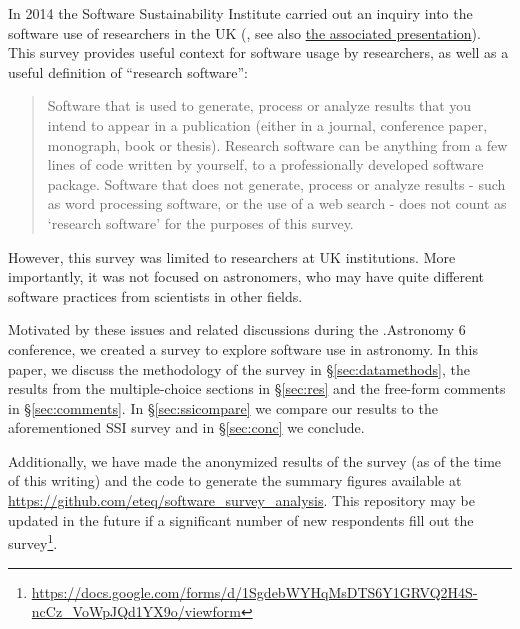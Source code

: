 In 2014 the Software Sustainability Institute carried out an inquiry into the software use of researchers in the UK  (\cite{f824cd98-b953-4c08-96c8-2533188bc4c4}, see also \href{http://wl.figshare.com/articles/1243288/embed?show_title=1}{the associated presentation}). This survey provides useful context for software usage by researchers, as well as a useful definition of ``research software'':
\begin{quote}
Software that is used to generate, process or analyze results that you intend to appear in a publication (either in a journal, conference paper, monograph, book or thesis). Research software can be anything from a few lines of code written by yourself, to a professionally developed software package. Software that does not generate, process or analyze results - such as word processing software, or the use of a web search - does not count as ‘research software’ for the purposes of this survey.
\end{quote}
However, this survey was limited to researchers at UK institutions.  More importantly, it was not focused on astronomers, who may have quite different software practices from scientists in other fields.

Motivated by these issues and related discussions during the .Astronomy 6 conference, we created a survey to explore software use in astronomy.  In this paper, we discuss the methodology of the survey in \S \ref{sec:datamethods}, the results from the multiple-choice sections in \S \ref{sec:res} and the free-form comments in \S \ref{sec:comments}. In \S \ref{sec:ssicompare} we compare our results to the aforementioned SSI survey and in \S \ref{sec:conc} we conclude.

Additionally, we have made the anonymized results of the survey (as of the time of this writing) and the code to generate the summary figures available at \url{https://github.com/eteq/software_survey_analysis}. This repository may be updated in the future if a significant number of new respondents fill out the survey\footnote{\url{https://docs.google.com/forms/d/1SgdebWYHqMsDTS6Y1GRVQ2H4S-ncCz_VoWpJQd1YX9o/viewform}}.
    
  
  
  
  
  
  
  
  
  